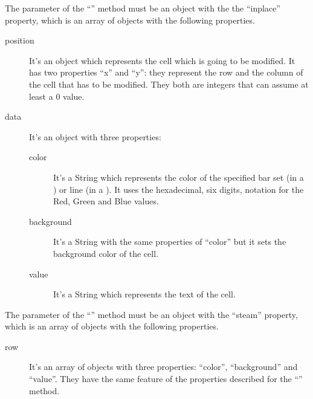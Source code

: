 				The parameter of the “” method must be an object with the the “inplace” property, which is an array of objects with the following properties. 
				\begin{description}
					\item[position] It's an object which represents the cell which is going to be modified. It has two properties “x” and “y”: they represent the row and the column of the cell that has to be modified. They both are integers that can assume at least a 0 value.
					\item[data] It's an object with three properties:
					\begin{description}
						\item[color] It's a String which represents the color of the specified bar set (in a ) or line (in a ). It uses the hexadecimal, six digits, notation for the Red, Green and Blue values. 
						\item[background] It's a String with the same properties of “color” but it sets the background color of the cell.
						\item[value] It's a String which represents the text of the cell.
					\end{description}
				\end{description}
				The parameter of the “” method must be an object with the “steam” property, which is an array of objects with the following properties.
				\begin{description}
					\item[row] It's an array of objects with three properties: “color”, “background” and “value”. They have the same feature of the properties described for the “” method.
				\end{description}
